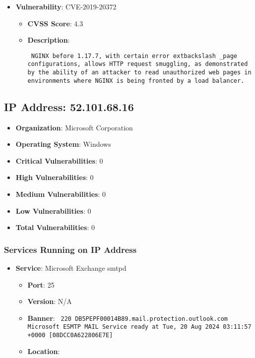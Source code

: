 \documentclass{article}
\begin{document}
\begin{itemize}
        \item \textbf{Vulnerability}: CVE-2019-20372
        \begin{itemize}
            \item \textbf{CVSS Score}:  4.3 
            \item \textbf{Description}: \parbox{\linewidth}{\texttt{ NGINX before 1.17.7, with certain error	extbackslash _page configurations, allows HTTP request smuggling, as demonstrated by the ability of an attacker to read unauthorized web pages in environments where NGINX is being fronted by a load balancer. }}
        \end{itemize}
    
\end{itemize}


\clearpage



\subsection*{IP Address: 52.101.68.16}

\begin{itemize}
    \item \textbf{Organization}: Microsoft Corporation
    \item \textbf{Operating System}:  Windows 
    \item \textbf{Critical Vulnerabilities}: 0
    \item \textbf{High Vulnerabilities}: 0
    \item \textbf{Medium Vulnerabilities}: 0
    \item \textbf{Low Vulnerabilities}: 0
    \item \textbf{Total Vulnerabilities}: 0
\end{itemize}

\subsubsection*{Services Running on IP Address}

\begin{itemize}
    
        \item \textbf{Service}: Microsoft Exchange smtpd
        \begin{itemize}
            \item \textbf{Port}: 25
            \item \textbf{Version}:  N/A 
            \item \textbf{Banner}: \texttt{ 220 DB5PEPF00014B89.mail.protection.outlook.com Microsoft ESMTP MAIL Service ready at Tue, 20 Aug 2024 03:11:57 +0000 [08DCC0A622806E7E]
 }
            \item \textbf{Location}: \href{  }{  }
        \end{itemize}
    
\end{itemize}
\end{document}
